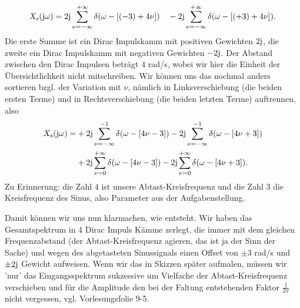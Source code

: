 \begin{ExCalc}
\begin{equation}
X_\mathrm{s}(\im\omega) = 2\im
\sum_{\nu=-\infty}^{+\infty} \delta(\omega - [(-3)+4\nu])
\quad-
2\im
\sum_{\nu=-\infty}^{+\infty} \delta(\omega - [(+3)+4\nu]).
\end{equation}
Die erste Summe ist ein Dirac Impulskamm mit positiven Gewichten $2\im$, die
zweite ein Dirac Impulskamm mit negativen Gewichten $-2\im$. Der Abstand zwischen
den Dirac Impulsen beträgt $4$ rad/s, wobei wir hier die Einheit der
Übersichtlichkeit nicht mitschreiben.
%
Wir können uns das nochmal anders sortieren bzgl. der Variation mit $\nu$,
nämlich in Linksverschiebung (die beiden ersten Terme) und in Rechtsverschiebung
(die beiden letzten Terme) auftrennen, also
\begin{align}
X_\mathrm{s}(\im\omega) =
&+2\im\sum_{\nu=-\infty}^{-1} \delta(\omega - [4\nu-3])
-2\im\sum_{\nu=-\infty}^{-1} \delta(\omega - [4\nu+3])\\
&+2\im\sum_{\nu=0}^{+\infty} \delta(\omega - [4\nu-3])
-2\im\sum_{\nu=0}^{+\infty} \delta(\omega - [4\nu+3]).
\end{align}
Zu Erinnerung: die Zahl $4$ ist unsere Abtast-Kreisfrequenz und die Zahl $3$
die Kreisfrequenz des Sinus, also Parameter aus der Aufgabenstellung.

Damit können wir uns nun klarmachen, wie
 entsteht. Wir haben das Gesamtspektrum
in 4 Dirac Impuls Kämme zerlegt, die immer mit dem gleichen Frequenzabstand
(der Abtast-Kreisfrequenz agieren, das ist ja der Sinn der Sache) und wegen
des abgetasteten Sinussignals einen Offset von $\pm 3$ rad/s und $\pm 2\im$ Gewicht
aufweisen.
Wenn wir das in Skizzen später aufmalen, müssen wir 'nur' das Eingangsspektrum
sukzessive um Vielfache der Abtast-Kreisfrequenz verschieben und für die Amplitude
den bei der Faltung entstehenden Faktor $\frac{1}{2\pi}$ nicht vergessen, vgl.
Vorlesungsfolie 9-5.
\end{ExCalc}

